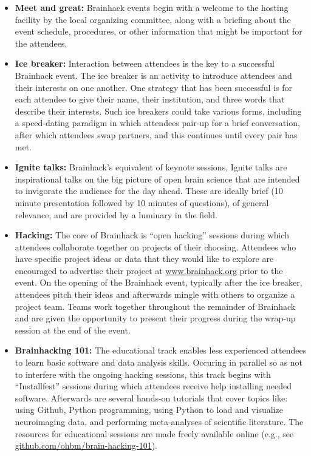 \documentclass[11pt]{bmc_article_s50}
\begin{document}
\begin{itemize}
\item
  \textbf{Meet and great:} Brainhack events begin with a welcome to the hosting facility by the local organizing committee, along with a briefing about the event schedule, procedures, or other information that might be important for the attendees.
\item
  \textbf{Ice breaker:} Interaction between attendees is the key to a successful Brainhack event. The ice breaker is an activity to introduce attendees and their interests on one another. One strategy that has been successful is for each attendee to give their name, their institution, and three words that describe their interests. Such ice breakers could take various forms, including a speed-dating paradigm in which attendees pair-up for a brief conversation, after which attendees swap partners, and this continues until every pair has met.
\item
  \textbf{Ignite talks:} Brainhack's equivalent of keynote sessions, Ignite talks are inspirational talks on the big picture of open brain science that are intended to invigorate the audience for the day ahead. These are ideally brief (10 minute presentation followed by 10 minutes of questions), of general relevance, and are provided by a luminary in the field.
\item
  \textbf{Hacking:} The core of Brainhack is ``open hacking'' sessions during which attendees collaborate together on projects of their choosing. Attendees who have specific project ideas or data that they would like to explore are encouraged to advertise their project at \href{http://www.brainhack.org}{www.brainhack.org} prior to the event. On the opening of the Brainhack event, typically after the ice breaker, attendees pitch their ideas and afterwards mingle with others to organize a project team. Teams work together throughout the remainder of Brainhack and are given the opportunity to present their progress during the wrap-up session at the end of the event.
\item
  \textbf{Brainhacking 101:} The educational track enables less experienced attendees to learn basic software and data analysis skills. Occuring in parallel so as not to interfere with the ongoing hacking sessions, this track begins with ``Installfest'' sessions during which attendees receive help installing needed software. Afterwards are several hands-on tutorials that cover topics like: using Github, Python programming, using Python to load and visualize neuroimaging data, and performing meta-analyses of scientific literature. The resources for educational sessions are made freely available online (e.g., see \href{https://github.com/ohbm/brain-hacking-101}{github.com/ohbm/brain-hacking-101}).

\end{itemize}
\end{document}
